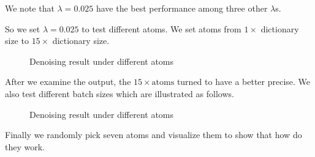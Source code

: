\documentclass[UTF8]{article}
\begin{document}
We note that $\lambda = 0.025$ have the best performance among three other  $\lambda$s.

So we set $\lambda = 0.025$ to test different atoms. We set atoms from $ 1 \times$ dictionary size to $ 15 \times$ dictionary size.

\begin{figure}[H]
    \centering
    \caption{Denoising result under different atoms}
\end{figure}

After we examine the output, the $15 \times \text{atoms}$ turned to have a better precise. We also test different batch sizes which are illustrated as follows.

\begin{figure}[H]
    \centering
    \caption{Denoising result under different atoms}
\end{figure}

Finally we randomly pick seven atoms and visualize them to show that how do they work.
\end{document}
